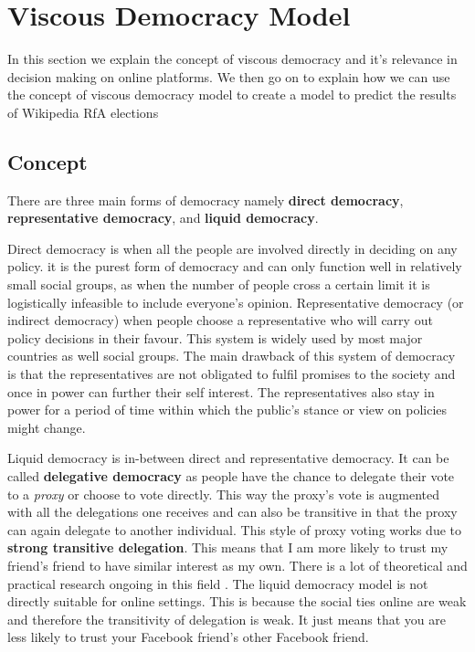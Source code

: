 \section{Viscous Democracy Model}
\label{sec:model}
In this section we explain the concept of viscous democracy \cite{ViscousDemocracy} and it's relevance in decision making on online platforms. We then go on to explain how we can use the concept of viscous democracy model to create a model to predict the results of Wikipedia RfA elections

\subsection{Concept}
There are three main forms of democracy namely \textbf{direct democracy}, \textbf{representative democracy}, and \textbf{liquid democracy}.

Direct democracy is when all the people are involved directly in deciding on any policy. it is the purest form of democracy and can only function well in relatively small social groups, as when the number of people cross a certain limit it is logistically infeasible to include everyone's opinion. Representative democracy (or indirect democracy) when people choose a representative who will carry out policy decisions in their favour. This system is widely used by most major countries as well social groups. The main drawback of this system of democracy is that the representatives are not obligated to fulfil promises to the society and once in power can further their self interest. The representatives also stay in power for a period of time within which the public's stance or view on policies might change.

Liquid democracy is in-between direct and representative democracy. It can be called \textbf{delegative democracy} as people have the chance to delegate their vote to a \textit{proxy} or choose to vote directly. This way the proxy's vote is augmented with all the delegations one receives and can also be transitive in that the proxy can again delegate to another individual. This style of proxy voting works due to \textbf{strong transitive delegation}. This means that I am more likely to trust my friend's friend to have similar interest as my own. There is a lot of theoretical and practical research ongoing in this field \cite{kahng2018liquid,hardt2015google}. The liquid democracy model is not directly suitable for online settings. This is because the social ties online are weak and therefore the transitivity of delegation is weak. It just means that you are less likely to trust your Facebook friend's other Facebook friend. 


